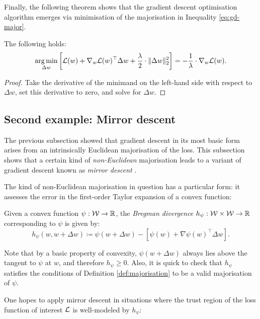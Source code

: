 \begin{refsection}
Finally, the following theorem shows that the gradient descent optimisation algorithm emerges via minimisation of the majorisation in Inequality \ref{eq:gd-major}.

\begin{theorem}\label{thm:gd} The following holds:
\begin{equation}
    \operatorname*{arg\,min}_{\Delta w} \left[\mathcal{L}(w) + \nabla_w \mathcal{L}(w)^\top \Delta w + \frac{\lambda}{2} \cdot \Vert {\Delta w} \Vert_2^2\right] = - \frac{1}{\lambda} \cdot \nabla_w \mathcal{L}(w).
\end{equation}
\end{theorem}
\begin{proof}
    Take the derivative of the minimand on the left-hand side with respect to $\Delta w$, set this derivative to zero, and solve for $\Delta w$.
\end{proof}

\subsection{Second example: Mirror descent}

The previous subsection showed that gradient descent in its most basic form arises from an intrinsically Euclidean majorisation of the loss. This subsection shows that a certain kind of \textit{non-Euclidean} majorisation leads to a variant of gradient descent known as \textit{mirror descent} \citep{nemirovsky_yudin_1983}.

The kind of non-Euclidean majorisation in question has a particular form: it assesses the error in the first-order Taylor expansion of a convex function:

\begin{definition} Given a convex function $\psi:\mathcal{W} \to \mathbb{R}$, the \textit{Bregman divergence} $h_\psi:\mathcal{W}\times\mathcal{W} \to \mathbb{R}$ corresponding to $\psi$ is given by:
\begin{equation}
    h_\psi(w,w+\Delta w) \coloneqq \psi(w+\Delta w) - \left[\psi(w) + \nabla \psi(w)^\top \Delta w\right].
\end{equation}
\end{definition}
Note that by a basic property of convexity, $\psi(w+\Delta w)$ always lies above the tangent to $\psi$ at $w$, and therefore $h_\psi \geq 0$. Also, it is quick to check that $h_\psi$ satisfies the conditions of Definition \ref{def:majorisation} to be a valid majorisation of $\psi$.

One hopes to apply mirror descent in situations where the trust region of the loss function of interest $\mathcal{L}$ is well-modeled by $h_\psi$:


\end{refsection}
